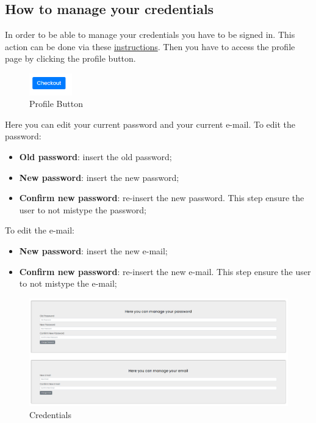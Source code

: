 \subsection{How to manage your credentials} \label{_credentials}
In order to be able to manage your credentials you have to be signed in. This action can be done via these \hyperref[_signin]{instructions}.
Then you have to access the profile page by clicking the profile button.
\begin{figure}[H]
    \centering
    \includegraphics[width=5em]{res/images/cliente/profilebutton.png}
    \caption{Profile Button}
\end{figure}

Here you can edit your current password and your current e-mail.
To edit the password:
\begin{itemize} 
    \item \textbf{Old password}: insert the old password;
    \item \textbf{New password}: insert the new password; 
    \item \textbf{Confirm new password}: re-insert the new password. This step ensure the user to not mistype the password; 
\end{itemize}

To edit the e-mail:
\begin{itemize} 
    \item \textbf{New password}: insert the new e-mail; 
    \item \textbf{Confirm new password}: re-insert the new e-mail. This step ensure the user to not mistype the e-mail; 
\end{itemize}

\begin{figure}[H]
    \centering
    \includegraphics[width=\linewidth]{res/images/cliente/credentials.png}
    \caption{Credentials}
\end{figure}
